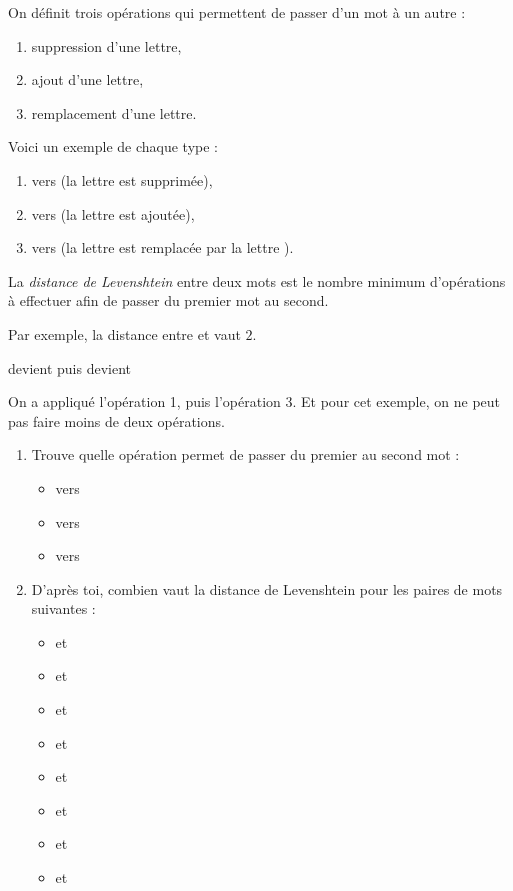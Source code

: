 \documentclass[class=report,crop=false, 12pt]{standalone}
\begin{document}
\begin{activite}

On définit trois opérations qui permettent de passer d'un mot à un autre :
\begin{enumerate}
  \item suppression d'une lettre,
  \item ajout d'une lettre, 
  \item remplacement d'une lettre. 
\end{enumerate}
Voici un exemple de chaque type :
\begin{enumerate}
  \item {} vers  (la lettre  est supprimée), 
  \item {} vers  (la lettre  est ajoutée), 
  \item {} vers  (la lettre  est remplacée par la lettre ). 
\end{enumerate}

La \emph{distance de Levenshtein} entre deux mots est le nombre minimum d'opérations à effectuer afin de passer du premier mot au second.

Par exemple, la distance entre  et  vaut $2$.

\centerline{ \quad devient \quad {} \quad puis devient \quad {}}

On a appliqué l'opération 1, puis l'opération 3. Et pour cet exemple, on ne peut pas faire moins de deux opérations.

\begin{enumerate}
  \item Trouve quelle opération permet de passer du premier au second mot :
  \begin{itemize}
    \item {} vers 
    \item {} vers 
    \item {} vers  
  \end{itemize}   

 
  \item D'après toi, combien vaut la distance de Levenshtein pour les paires de mots suivantes : 
  \begin{itemize}
    \item {} et 
    \item {} et 
    \item {} et      
    \item {} et  
    \item {} et     
    \item {} et 
    \item {} et   
    \item {} et         
  \end{itemize}  

  
\end{enumerate}

\end{activite}
\end{document}
